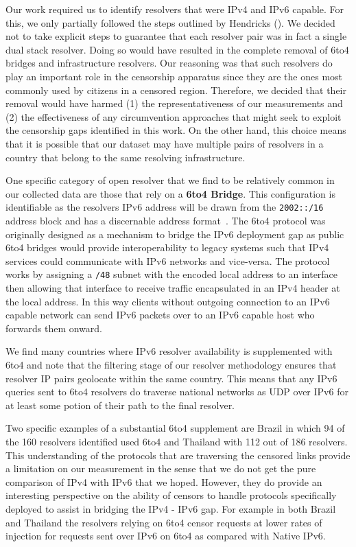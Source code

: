 Our work required us to identify resolvers that were IPv4 and IPv6 capable. For
this, we only partially followed the steps outlined by Hendricks \etal
(\cf {}). We decided not to take explicit steps
to guarantee that each resolver pair was in fact a single dual stack resolver.
Doing so would have resulted in the complete removal of 6to4 bridges and
infrastructure resolvers. Our reasoning was that such resolvers do play an
important role in the censorship apparatus since they are the ones most
commonly used by citizens in a censored region. Therefore, we decided that
their removal would have harmed (1) the representativeness of our measurements
and (2) the effectiveness of any circumvention approaches that might seek to
exploit the censorship gaps identified in this work. On the other hand, this
choice means that it is possible that our dataset may have multiple pairs of
resolvers in a country that belong to the same resolving infrastructure. 

One specific category of open resolver that we find to be relatively common in
our collected data are those that rely on a \textbf{6to4 Bridge}. This
configuration is identifiable as the resolvers IPv6 address will be drawn from
the \texttt{2002::/16} address block and has a discernable address
format~\cite{RFC3056}. The 6to4 protocol was originally designed as a mechanism
to bridge the IPv6 deployment gap as public 6to4 bridges would provide
interoperability to legacy systems such that IPv4 services could communicate
with IPv6 networks and vice-versa. The protocol works by assigning a
\texttt{/48} subnet with the encoded local address to an interface
then allowing that interface to receive traffic encapsulated in an IPv4 header
at the local address. In this way clients without outgoing connection to an IPv6
capable network can send IPv6 packets over to an IPv6 capable host who forwards
them onward.

We find many countries where IPv6 resolver availability is supplemented with
6to4 and note that the filtering stage of our resolver methodology ensures that
resolver IP pairs geolocate within the same country. This means that any IPv6
queries sent to 6to4 resolvers do traverse national networks as UDP over IPv6
for at least some potion of their path to the final resolver.

Two specific examples of a substantial 6to4 supplement are Brazil in which 94 of
the 160 resolvers identified used 6to4 and Thailand with 112 out of 186
resolvers. This understanding of the protocols that are traversing the censored
links provide a limitation on our measurement in the sense that we do not get
the pure comparison of IPv4 with IPv6 that we hoped. However, they do provide an
interesting perspective on the ability of censors to handle protocols
specifically deployed to assist in bridging the IPv4 - IPv6 gap. For example in
both Brazil and Thailand the resolvers relying on 6to4 censor requests at lower
rates of injection for requests sent over IPv6 on 6to4 as compared with Native
IPv6.

